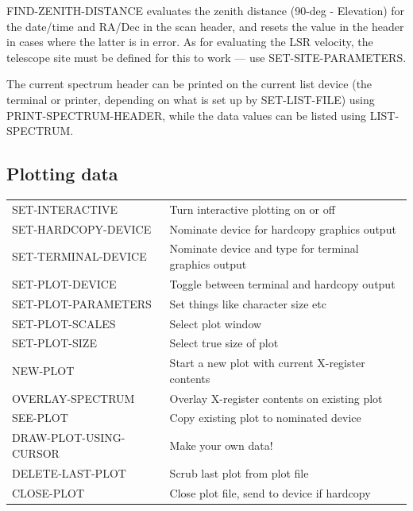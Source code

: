 \documentclass[11pt,twoside]{report}
\begin{document}
FIND-ZENITH-DISTANCE evaluates the zenith distance
(90-deg - Elevation) for the date/time and RA/Dec in the scan header, and
resets the value in the header in cases where the latter is in error. As for
evaluating the LSR velocity, the telescope
site must be defined for this to
work --- use SET-SITE-PARAMETERS. 

The current spectrum header can be printed on the current list device
(the terminal or printer, depending on what is set up by SET-LIST-FILE) 
using PRINT-SPECTRUM-HEADER, while the data values can be listed 
using LIST-SPECTRUM. 

\subsection{Plotting data}

\begin{tabular}{ll}
SET-INTERACTIVE        & Turn interactive plotting on or off\\
SET-HARDCOPY-DEVICE    & Nominate device for hardcopy graphics output\\
SET-TERMINAL-DEVICE    & Nominate device and type for terminal graphics output\\
SET-PLOT-DEVICE        & Toggle between terminal and hardcopy output\\
SET-PLOT-PARAMETERS    & Set things like character size etc\\
SET-PLOT-SCALES        & Select plot window\\
SET-PLOT-SIZE          & Select true size of plot\\
NEW-PLOT               & Start a new plot with current X-register contents\\
OVERLAY-SPECTRUM       & Overlay X-register contents on existing plot\\
SEE-PLOT               & Copy existing plot to nominated device\\
DRAW-PLOT-USING-CURSOR & Make your own data!\\
DELETE-LAST-PLOT       & Scrub last plot from plot file\\
CLOSE-PLOT             & Close plot file, send to device if hardcopy\\
\end{tabular}
\end{document}
